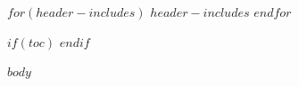 \documentclass[12pt]{book}
\begin{document}
$for(header-includes)$
$header-includes$
$endfor$

\frontmatter
$if(toc)$
\tableofcontents
$endif$

\mainmatter
$body$
\end{document}
